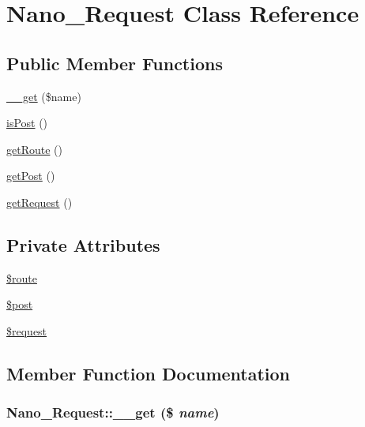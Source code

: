 \hypertarget{classNano__Request}{
\section{Nano\_\-Request Class Reference}
\label{classNano__Request}
}
\subsection*{Public Member Functions}
\begin{CompactItemize}
\item 
\hyperlink{classNano__Request_bab341d01834cac46d11bddf49ed8724}{\_\-\_\-get} (\$name)
\item 
\hyperlink{classNano__Request_f90aea04a9a598f220072ce05cc8f050}{isPost} ()
\item 
\hyperlink{classNano__Request_476422c0a66d70b8cb362ca6dece85c0}{getRoute} ()
\item 
\hyperlink{classNano__Request_3854dcacacdebd060d36cf6cfa89d2bb}{getPost} ()
\item 
\hyperlink{classNano__Request_87b53048868a2e87399db72f5eafa197}{getRequest} ()
\end{CompactItemize}
\subsection*{Private Attributes}
\begin{CompactItemize}
\item 
\hyperlink{classNano__Request_097c3ef2f417cabf53dd1f1d75aa2a65}{\$route}
\item 
\hyperlink{classNano__Request_3d3cfcf3a580a5160e1b4c3cb589c811}{\$post}
\item 
\hyperlink{classNano__Request_e9023d764e866d707d2007697bc4e396}{\$request}
\end{CompactItemize}


\subsection{Member Function Documentation}
\hypertarget{classNano__Request_bab341d01834cac46d11bddf49ed8724}{
\subsubsection[{\_\-\_\-get}]{\setlength{\rightskip}{0pt plus 5cm}Nano\_\-Request::\_\-\_\-get (\$ {\em name})}}
\label{classNano__Request_bab341d01834cac46d11bddf49ed8724}


